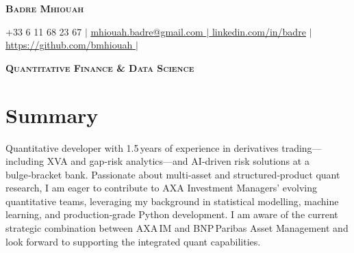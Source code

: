\documentclass[letterpaper,10.6pt]{article}
\begin{document}


\begin{center}
    \textbf{\Huge \scshape Badre Mhiouah} 

    \small +33 6 11 68 23 67 $|$ \href{mailto:badre.mhiouah@student-cs.fr}{\underline{mhiouah.badre@gmail.com} $|$ 
    \href{https://www.linkedin.com/in/badre-mhiouah-194401227/}{\underline{linkedin.com/in/badre}}} $|$ \href{https://github.com/bmhiouah}{\underline{https://github.com/bmhiouah} $|$ }
    
\end{center}

\begin{center}
\textbf {\scshape Quantitative Finance \& Data Science} 
\end{center}

\section*{Summary}
\small{Quantitative developer with 1.5 years of experience in derivatives trading—including XVA and gap‑risk analytics—and AI‑driven risk solutions at a bulge‑bracket bank.  Passionate about multi‑asset and structured‑product quant research, I am eager to contribute to AXA Investment Managers’ evolving quantitative teams, leveraging my background in statistical modelling, machine learning, and production‑grade Python development.  I am aware of the current strategic combination between AXA IM and BNP Paribas Asset Management and look forward to supporting the integrated quant capabilities.
}

\end{document}
